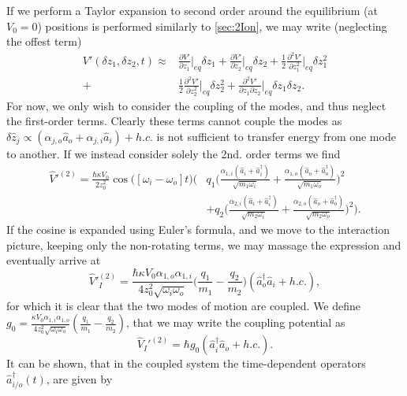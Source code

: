If we perform a Taylor expansion to second order around the equilibrium (at $V_0= 0$) positions is performed similarly to \cref{sec:2Ion}, we may write (neglecting the offest term)
\begin{align}
    V'(\delta z_1,\delta z_2,t)\approx &\frac{\partial V'}{\partial z_1}\bigg\vert_{eq}\delta z_1+\frac{\partial V'}{\partial z_2}\bigg\vert_{eq}\delta z_2
    +\frac{1}{2}\frac{\partial^2 V'}{\partial z_1^2}\bigg\vert_{eq}\delta z_1^2\nonumber\\+&\frac{1}{2}\frac{\partial^2 V'}{\partial z_2^2}\bigg\vert_{eq}\delta z_2^2
    +\frac{\partial^2 V'}{\partial z_1\partial z_2}\bigg\vert_{eq}\delta z_1\delta z_2.
\end{align}
For now, we only wish to consider the coupling of the modes, and thus neglect the first-order terms. Clearly these terms cannot couple the modes as $\delta\hat{z}_j\propto (\alpha_{j,o}\hat{a}_o+\alpha_{j,i}\hat{a}_i)+h.c.$ is not sufficient to transfer energy from one mode to another. If we instead consider solely the 2nd. order terms we find
\begin{align}
    \hat{V}'^{(2)} = \nonumber \frac{\hbar\kappa V_0}{2z_0^2}\cos{\big([\omega_i-\omega_o]t\big)}\bigg(&q_1\big(\frac{\alpha_{1,i}(\hat{a}_i+\hat{a}_i^\dagger)}{\sqrt{m_1\omega_i}}+\frac{\alpha_{1,o}(\hat{a}_o+\hat{a}_o^\dagger)}{\sqrt{m_1\omega_o}}\big)^2\\
    &+q_2\big(\frac{\alpha_{2,i}(\hat{a}_i+\hat{a}_i^\dagger)}{\sqrt{m_2\omega_i}}+\frac{\alpha_{2,o}(\hat{a}_o+\hat{a}_o^\dagger)}{\sqrt{m_2\omega_o}}\big)^2\bigg).
\end{align}
If the cosine is expanded using Euler's formula, and we move to the interaction picture, keeping only the non-rotating terms, we may massage the expression and eventually arrive at
\begin{equation}
    \hat{V}'^{(2)}_I = \frac{\hbar\kappa V_0\alpha_{1,o}\alpha_{1,i}}{4z_0^2\sqrt{\omega_i\omega_o}}\big(\frac{q_1}{m_1}-\frac{q_2}{m_2}\big)(\hat{a}_o^\dagger \hat{a}_i + h.c.),
\end{equation}
for which it is clear that the two modes of motion are coupled. We define $g_0 = \frac{\kappa V_0\alpha_{1,i}\alpha_{1,o}}{4z_0^2\sqrt{\omega_i\omega_o}}(\frac{q_1}{m_1}-\frac{q_2}{m_2})$, that we may write the coupling potential as 
\begin{equation}
    \hat{V}_I'^{(2)} = \hbar g_0(\hat{a}_i^\dagger \hat{a}_o + h.c.).
\end{equation}
It can be shown, that in the coupled system the time-dependent operators $\hat{a}_{i/o}^\dagger(t)$, are given by \cite{hou2022coherently}
